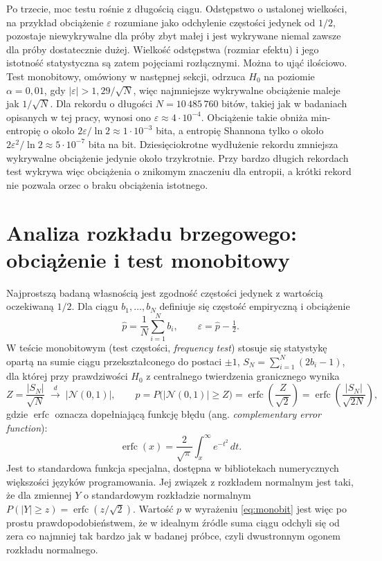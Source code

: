 Po trzecie, moc testu rośnie z długością ciągu. Odstępstwo o ustalonej
wielkości, na przykład obciążenie $\varepsilon$ rozumiane jako odchylenie
częstości jedynek od $1/2$, pozostaje niewykrywalne dla próby zbyt małej
i jest wykrywane niemal zawsze dla próby dostatecznie dużej. Wielkość
odstępstwa (rozmiar efektu) i jego istotność statystyczna są zatem pojęciami
rozłącznymi. Można to ująć ilościowo. Test monobitowy, omówiony w następnej
sekcji, odrzuca $H_0$ na poziomie $\alpha = 0{,}01$, gdy
$|\varepsilon| > 1{,}29/\sqrt{N}$, więc najmniejsze wykrywalne obciążenie
maleje jak $1/\sqrt{N}$. Dla rekordu o długości $N = 10\,485\,760$ bitów,
takiej jak w badaniach opisanych w tej pracy, wynosi ono
$\varepsilon \approx 4\cdot 10^{-4}$. Obciążenie takie obniża min-entropię
o około $2\varepsilon/\ln 2 \approx 1\cdot 10^{-3}$ bita, a entropię Shannona
tylko o około $2\varepsilon^2/\ln 2 \approx 5\cdot 10^{-7}$ bita na bit.
Dziesięciokrotne wydłużenie rekordu zmniejsza wykrywalne obciążenie jedynie
około trzykrotnie. Przy bardzo długich rekordach test wykrywa więc obciążenia
o znikomym znaczeniu dla entropii, a krótki rekord nie pozwala orzec o braku
obciążenia istotnego.

\section{Analiza rozkładu brzegowego: obciążenie i test monobitowy}

Najprostszą badaną własnością jest zgodność częstości jedynek z wartością
oczekiwaną $1/2$. Dla ciągu $b_1,\dots,b_N$ definiuje się częstość empiryczną
i obciążenie
%
\begin{equation}
  \hat{p} = \frac{1}{N}\sum_{i=1}^{N} b_i ,
  \qquad
  \varepsilon = \hat{p} - \tfrac{1}{2}.
  \label{eq:bias}
\end{equation}
%
W teście monobitowym (test częstości, \emph{frequency test}) stosuje się
statystykę opartą na sumie ciągu przekształconego do postaci $\pm 1$,
$S_N = \sum_{i=1}^{N}(2b_i - 1)$, dla której przy prawdziwości $H_0$
z centralnego twierdzenia granicznego wynika
%
\begin{equation}
  Z = \frac{|S_N|}{\sqrt{N}} \;\xrightarrow{\;d\;}\; |\mathcal{N}(0,1)| ,
  \qquad
  p = P\big(|\mathcal{N}(0,1)| \ge Z\big)
    = \operatorname{erfc}\!\left(\frac{Z}{\sqrt{2}}\right)
    = \operatorname{erfc}\!\left(\frac{|S_N|}{\sqrt{2N}}\right),
  \label{eq:monobit}
\end{equation}
%
gdzie $\operatorname{erfc}$ oznacza dopełniającą funkcję błędu (ang.
\emph{complementary error function}):
%
\begin{equation}
  \operatorname{erfc}(x) = \frac{2}{\sqrt{\pi}}\int_{x}^{\infty} e^{-t^2}\,dt .
  \label{eq:erfc}
\end{equation}
%
Jest to standardowa funkcja specjalna, dostępna w bibliotekach numerycznych
większości języków programowania. Jej związek z rozkładem normalnym jest
taki, że dla zmiennej $Y$ o standardowym rozkładzie normalnym
$P(|Y| \ge z) = \operatorname{erfc}(z/\sqrt{2})$. Wartość $p$ w wyrażeniu
\eqref{eq:monobit} jest więc po prostu prawdopodobieństwem, że w idealnym
źródle suma ciągu odchyli się od zera co najmniej tak bardzo jak w badanej
próbce, czyli dwustronnym ogonem rozkładu normalnego.


